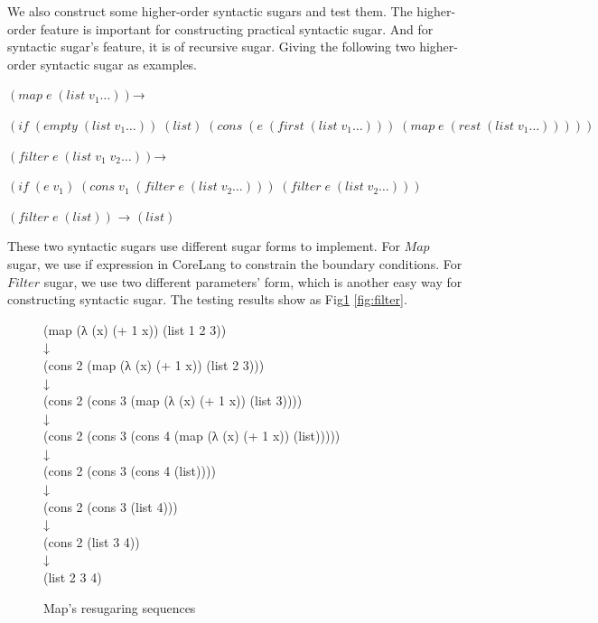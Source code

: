 We also construct some higher-order syntactic sugars and test them. The higher-order feature is important for constructing practical syntactic sugar. And for syntactic sugar's feature, it is of recursive sugar. Giving the following two higher-order syntactic sugar as examples.

\begin{flushleft}
	$(map\;e\;(list\;v_1\ldots))$→

	$(if\;(empty\;(list\;v_1\ldots))\;(list)\;(cons\;(e\;(first\;(list\;v_1\ldots)))\;(map\;e\;(rest\;(list\;v_1\ldots)))))$
\end{flushleft}

\begin{flushleft}
	$(filter\;e\;(list\;v_1\;v_2\ldots))$→

	$(if\;(e\;v_1)\;(cons\;v_1\;(filter\;e\;(list\;v_2\ldots)))\;(filter\;e\;(list\;v_2\ldots)))$

	$(filter\;e\;(list))$ → $(list)$
\end{flushleft}
These two syntactic sugars use different sugar forms to implement. For $Map$ sugar, we use if expression in CoreLang to constrain the boundary conditions. For $Filter$ sugar, we use two different parameters' form, which is another easy way for constructing syntactic sugar. The testing results show as Fig\ref{fig:map} \ref{fig:filter}.

\begin{figure}[ht]
	\centering
	\parbox[t]{\textwidth}{
				\begin{center}
				{
					\small\selectfont
					(map (λ (x) (+ 1 x)) (list 1 2 3))\\
					↓\\
					(cons 2 (map (λ (x) (+ 1 x)) (list 2 3)))\\
					↓\\
					(cons 2 (cons 3 (map (λ (x) (+ 1 x)) (list 3))))\\
					↓\\
					(cons 2 (cons 3 (cons 4 (map (λ (x) (+ 1 x)) (list)))))\\
					↓\\
					(cons 2 (cons 3 (cons 4 (list))))\\
					↓\\
					(cons 2 (cons 3 (list 4)))\\
					↓\\
					(cons 2 (list 3 4))\\
					↓\\
					(list 2 3 4)
				}
				\end{center}

			}
	\caption{Map's resugaring sequences}
\label{fig:map}
\end{figure}

